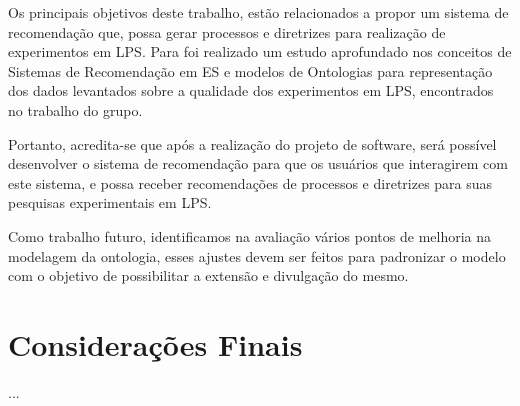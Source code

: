 Os principais objetivos deste trabalho, estão relacionados a propor um sistema de recomendação que, possa gerar processos e diretrizes para realização de experimentos em LPS. Para foi realizado um estudo aprofundado nos conceitos de Sistemas de Recomendação em ES e modelos de Ontologias para representação dos dados levantados sobre a qualidade dos experimentos em LPS, encontrados no trabalho do grupo.

Portanto, acredita-se que após a realização do projeto de software, será possível desenvolver o sistema de recomendação para que os usuários que interagirem com este sistema, e possa receber recomendações de processos e diretrizes para suas pesquisas experimentais em LPS.

Como trabalho futuro, identificamos na avaliação vários pontos de melhoria na modelagem da ontologia, esses ajustes devem ser feitos para padronizar o modelo com o objetivo de possibilitar a extensão e divulgação do mesmo.


\section{Considerações Finais}
\label{sec:concidaracoes_finais}

...